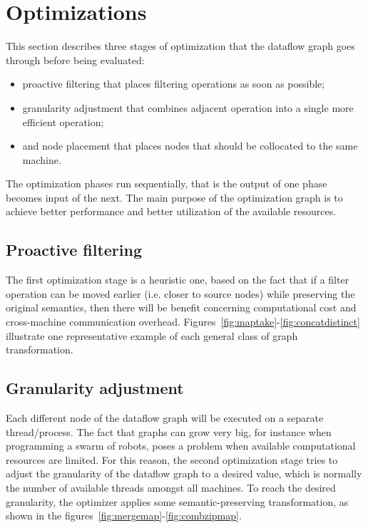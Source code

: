 \documentclass[sigplan,screen,10pt]{acmart}
\begin{document}

\section{Optimizations} \label{sec:optimization}

This section describes three stages of optimization that the dataflow graph goes
through before being evaluated:
\begin{itemize}
  \item proactive filtering that places filtering operations as soon as possible;
  \item granularity adjustment that combines adjacent operation into a single more efficient operation;
  \item and node placement that places nodes that should be collocated to the same machine.
\end{itemize}
The optimization phases run sequentially, that is the output of one phase becomes
input of the next. The main purpose of the optimization graph is to achieve better
performance and better utilization of the available resources.

\subsection{Proactive filtering}
The first optimization stage is a heuristic one, based on the fact that if a
filter operation can be moved earlier (i.e. closer to source nodes) while
preserving the original semantics, then there will be benefit concerning
computational cost and cross-machine communication overhead. Figures~\ref{fig:maptake}-\ref{fig:concatdistinct}
illustrate one representative example of each general class of
graph transformation.


\subsection{Granularity adjustment}
Each different node of the dataflow graph will be executed on a separate
thread/process. The fact that graphs can grow very big, for instance when
programming a swarm of robots, poses a problem when available
computational resources are limited. For this reason, the second optimization
stage tries to adjust the granularity of the dataflow graph to a desired value,
which is normally the number of available threads amongst all machines.
To reach the desired granularity, the optimizer applies some semantic-preserving
transformation, as shown in the figures~\ref{fig:mergemap}-\ref{fig:combzipmap}.
\end{document}
